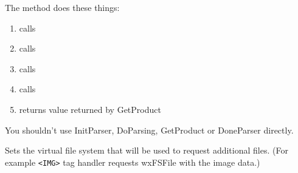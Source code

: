 The method does these things:

\begin{enumerate}
\item calls 
\item calls 
\item calls 
\item calls 
\item returns value returned by GetProduct
\end{enumerate}

You shouldn't use InitParser, DoParsing, GetProduct or DoneParser directly.

\label{wxhtmlparsersetfs}


Sets the virtual file system that will be used to request additional
files. (For example {\tt <IMG>} tag handler requests wxFSFile with the
image data.)

